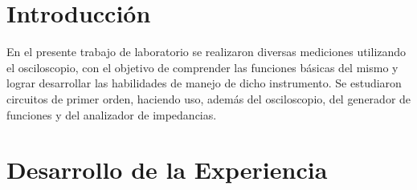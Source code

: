 \documentclass[11pt, a4paper]{article}
\begin{document}








\section*{Introducción}

En el presente trabajo de laboratorio se realizaron diversas mediciones utilizando el osciloscopio, con el objetivo de comprender las funciones básicas del mismo y lograr desarrollar las habilidades de manejo de dicho instrumento. Se estudiaron circuitos de primer orden, haciendo uso, además del osciloscopio, del generador de funciones y del analizador de impedancias.

\section*{Desarrollo de la Experiencia}
\end{document}
